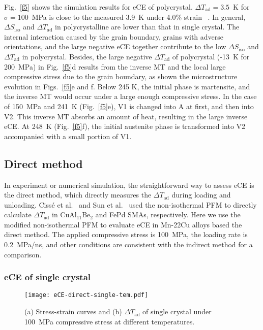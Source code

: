 \documentclass[reprint,3p,sort&compress,times,onecolumn]{elsarticle}
\begin{document}
Fig.~\ref{f5} shows the simulation results for eCE of polycrystal.
$\Delta T_{\text{ad}}=3.5$~K for $\sigma=100$~MPa is close to the measured 3.9~K under 4.0$\%$ strain ~\cite{qian2016elastocaloric}.
In general, $\Delta S_{\text{iso}}$ and $\Delta T_{\text{ad}}$ in polycrystalline are lower than that in single crystal. The internal interaction caused by the grain boundary, grains with adverse orientations, and the large negative eCE together contribute to the low $\Delta S_{\text{iso}}$ and $\Delta T_{\text{ad}}$ in polycrystal.
Besides, the large negative $\Delta T_{\text{ad}}$ of polycrystal (-13~K for 200~MPa) in Fig.~\ref{f5}d results from the inverse MT and the local large compressive stress due to the grain boundary, as shown the microstructure evolution in Figs.~\ref{f5}e and f. Below 245 K, the initial phase is martensite, and the inverse MT would occur under a large enough compressive stress. In the case of 150~MPa and 241~K (Fig.~\ref{f5}e), V1 is changed into A at first, and then into V2. This inverse MT absorbs an amount of heat, resulting in the large inverse eCE. At 248~K (Fig.~\ref{f5}f), the initial austenite phase is transformed into V2 accompanied with a small portion of V1.


\subsection{Direct method} 
In experiment or numerical simulation, the straightforward way to assess eCE is the direct method, which directly measures the $\Delta T_{\text{ad}}$ during loading and unloading. Ciss{\'e} et al.~\cite{cisse2020elastocaloric} and Sun et al.~\cite{sun2019non} used the non-isothermal PFM to directly calculate $\Delta T_{\text{ad}}$ in CuAl$_{11}$Be$_2$ and FePd SMAs, respectively. Here we use the modified non-isothermal PFM to evaluate eCE in Mn-22Cu
alloys based the direct method. The applied compressive stress is 100~MPa, the loading rate is 0.2~MPa/ns, and other conditions are consistent with the indirect method for a comparison.

\subsubsection{eCE of single crystal}
\begin{figure*}[!t]
\centering
  \texttt{[image: eCE-direct-single-tem.pdf]}
  \caption{(a) Stress-strain curves and (b) $\Delta T_{\text{ad}}$ of single crystal under 100~MPa compressive stress at different temperatures.}\label{f6}
\end{figure*}
\end{document}
